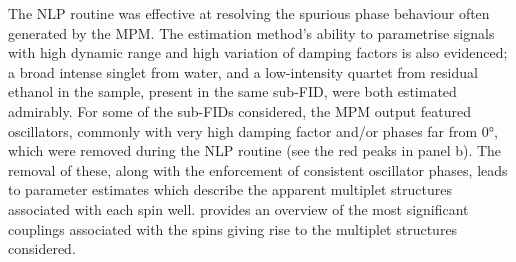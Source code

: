 The \ac{NLP} routine was effective at resolving the spurious phase behaviour
often generated by the \ac{MPM}.
The estimation method's ability to parametrise signals with high
dynamic range and high variation of damping factors is also evidenced;
a broad intense singlet from water, and a low-intensity quartet from
residual ethanol in the sample, present in the same sub-\ac{FID}, were both
estimated admirably.
For some of the sub-\acp{FID} considered, the \ac{MPM} output featured
oscillators, commonly with very high damping factor and/or phases far from
\ang{0}, which were removed during the \ac{NLP} routine (see the red
peaks in panel b). The removal of these, along with the enforcement
of consistent oscillator phases, leads to parameter
estimates which describe the apparent multiplet structures associated with each
spin well.  provides an overview of the
most significant couplings associated with the spins giving rise to the
multiplet structures considered.
